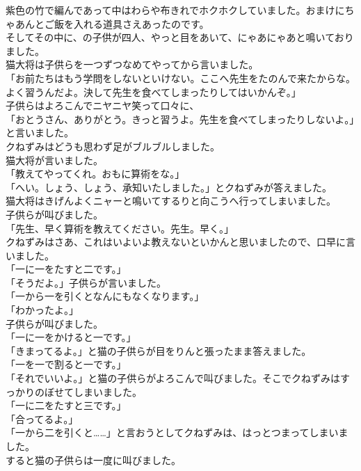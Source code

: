 \documentclass[
a4paper,
10pt,
book]
{tarticle}
\begin{document}
紫色の竹で編んであって中はわらや布きれでホクホクしていました。おまけにちゃあんとご飯を入れる道具さえあったのです。\\
\indent そしてその中に、の子供が四人、やっと目をあいて、にゃあにゃあと鳴いておりました。\\
\indent 猫大将は子供らを一つずつなめてやってから言いました。\\
「お前たちはもう学問をしないといけない。ここへ先生をたのんで来たからな。よく習うんだよ。決して先生を食べてしまったりしてはいかんぞ。」\\
\indent 子供らはよろこんでニヤニヤ笑って口々に、\\
「おとうさん、ありがとう。きっと習うよ。先生を食べてしまったりしないよ。」と言いました。\\
\indent クねずみはどうも思わず足がブルブルしました。\\
\indent 猫大将が言いました。\\
「教えてやってくれ。おもに算術をな。」\\
「へい。しょう、しょう、承知いたしました。」とクねずみが答えました。\\
\indent 猫大将はきげんよくニャーと鳴いてするりと向こうへ行ってしまいました。\\
\indent 子供らが叫びました。\\
「先生、早く算術を教えてください。先生。早く。」\\
\indent クねずみはさあ、これはいよいよ教えないといかんと思いましたので、口早に言いました。\\
「一に一をたすと二です。」\\
「そうだよ。」子供らが言いました。\\
「一から一を引くとなんにもなくなります。」\\
「わかったよ。」\\
\indent 子供らが叫びました。\\
「一に一をかけると一です。」\\
「きまってるよ。」と猫の子供らが目をりんと張ったまま答えました。\\
「一を一で割ると一です。」\\
「それでいいよ。」と猫の子供らがよろこんで叫びました。そこでクねずみはすっかりのぼせてしまいました。\\
「一に二をたすと三です。」\\
「合ってるよ。」\\
「一から二を引くと……」と言おうとしてクねずみは、はっとつまってしまいました。\\
\indent すると猫の子供らは一度に叫びました。\\
\end{document}
